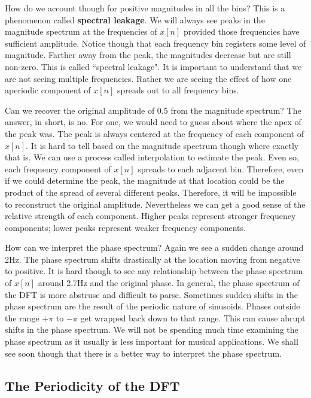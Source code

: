 How do we account though for positive magnitudes in all the bins?  This is a phenomenon called \textbf{spectral leakage}.  
We will always see peaks in the magnitude spectrum at the frequencies of $x[n]$ provided those frequencies have
sufficient amplitude.  Notice though that each frequency bin registers some level of magnitude.  Farther away from the 
peak, the magnitudes decrease but are still non-zero.  This is called ``spectral leakage".  It is important to understand
that we are not seeing multiple frequencies.  Rather we are seeing the effect of how one aperiodic component of $x[n]$
spreads out to all frequency bins.   

Can we recover the original amplitude of 0.5 from the magnitude spectrum?  The answer, in short, is no.  For one, we
would need to guess about where the apex of the peak was.  The peak is always centered at the frequency of each
component of $x[n]$.  It is hard to tell based on the magnitude spectrum though where exactly that is.  We can use
a process called interpolation to estimate the peak.  Even so, each frequency component of $x[n]$ spreads to each
adjacent bin.  Therefore, even if we could determine the peak, the magnitude at that location could be the product
of the spread of several different peaks.  Therefore, it will be impossible to reconstruct the original amplitude.  
Nevertheless we can get a good sense of the relative strength of each component.  Higher peaks represent stronger
frequency components; lower peaks represent weaker frequency components.

How can we interpret the phase spectrum?  Again we see a sudden change around 2Hz.  The phase spectrum shifts
drastically at the location moving from negative to positive.  It is hard though to see any relationship between the phase spectrum of $x[n]$ around 2.7Hz and the original phase.  In 
general, the phase spectrum of the DFT is more abstruse and difficult to parse.  Sometimes sudden shifts in the
phase spectrum are the result of the periodic nature of sinusoids.  Phases outside the range $+\pi$ to $-\pi$ get
wrapped back down to that range.  This can cause abrupt shifts in the phase spectrum.  We will not be spending
much time examining the phase spectrum as it usually is less important for musical applications. We shall see soon
though that there is a better way to interpret the phase spectrum.

\subsection*{The Periodicity of the DFT}

